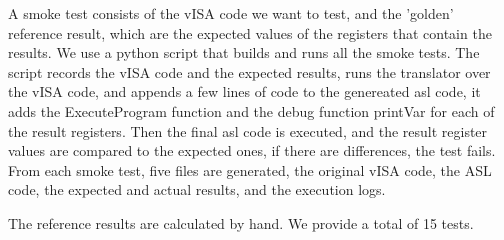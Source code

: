 A smoke test consists of the vISA code we want to test, and the 'golden'
reference result, which are the expected values of the registers that contain
the results. We use a python script that builds and runs all the smoke tests.
The script records the vISA code and the expected results, runs the translator
over the vISA code, and appends a few lines of code to the genereated asl code,
it adds the ExecuteProgram function and the debug function printVar for each of
the result registers. Then the final asl code is executed, and the result
register values are compared to the expected ones, if there are differences,
the test fails. From each smoke test, five files are generated, the original
vISA code, the ASL code, the expected and actual results, and the execution
logs.

The reference results are calculated by hand. We provide a total of 15 tests.

